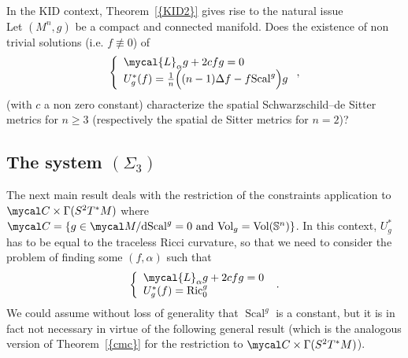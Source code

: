 \documentclass[a4paper,11pt,leqno]{amsart}
\numberwithin{equation}{section}
\theoremstyle{main}
\begin{document}
In the KID context, Theorem~{\ref{{KID2}}} gives rise to the natural issue\\
{} Let $(M^n,g)$ be a compact and connected manifold. Does the existence of non trivial solutions (i.e. $f\not\equiv0$) of 
$$
\left\{
\begin{array}{l}
	 \mycal{L}_\alpha g + 2cfg= 0 \\
	 U_g^* (f)=\frac{1}{n}\Big((n-1) \Delta f -f {\operatorname{Scal}}^g\Big) g
\end{array}\right. ,$$
(with $c$ a non zero constant) characterize the spatial Schwarzschild--de Sitter metrics for $n\ge 3$ (respectively the spatial de Sitter metrics for $n=2$)? \\

\subsection{The system $(\Sigma_3)$} The next main result deals with the restriction of the constraints application to  $\mycal C \times \Gamma(S^2 T^*M)$ where  $\mycal C= \left\{g\in\mycal M/ {{\rm d}}{\operatorname{Scal}}^g=0 \textrm{ and }   {\operatorname{Vol}}_{g}={\operatorname{Vol}}({{\mathbb S^{n}}})\right\} $. In this context, $U^*_g$ has to be equal to the traceless Ricci curvature, so that we need to consider the problem of finding some $(f,\alpha)$ such that
$$\left\{
\begin{array}{l}
	 \mycal{L}_\alpha g + 2cfg= 0 \\
	 U_g^* (f)={\operatorname{Ric}}^g_0
\end{array}\right. \ .$$
We could assume without loss of generality that ${\operatorname{Scal}}^g$ is a constant, but it is in fact not necessary in virtue of the following general result (which is the analogous version of Theorem~{\ref{{cmc}}} for the restriction to $\mycal C \times \Gamma(S^2 T^*M)$).
\end{document}
